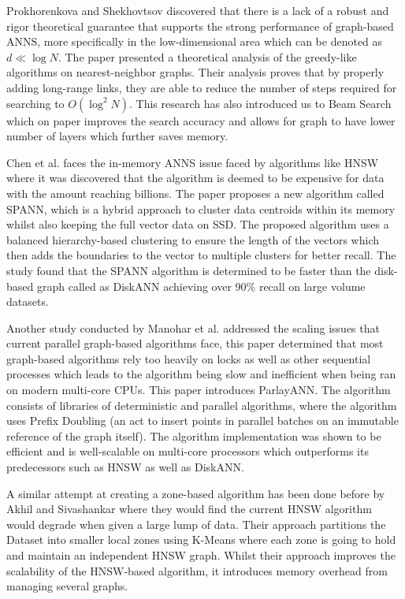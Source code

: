 \documentclass[conference]{IEEEtran}
\begin{document}
Prokhorenkova and Shekhovtsov \cite{prokhorenkova2020} discovered that there is a lack of a robust and rigor theoretical guarantee that supports the strong performance of graph-based ANNS, more specifically in the low-dimensional area which can be denoted as $d \ll \log N$. The paper presented a theoretical analysis of the greedy-like algorithms on nearest-neighbor graphs. Their analysis proves that by properly adding long-range links, they are able to reduce the number of steps required for searching to $O(\log^2 N)$. This research has also introduced us to Beam Search which on paper improves the search accuracy and allows for graph to have lower number of layers which further saves memory.

Chen et al. \cite{chen2021} faces the in-memory ANNS issue faced by algorithms like HNSW where it was discovered that the algorithm is deemed to be expensive for data with the amount reaching billions. The paper proposes a new algorithm called SPANN, which is a hybrid approach to cluster data centroids within its memory whilst also keeping the full vector data on SSD. The proposed algorithm uses a balanced hierarchy-based clustering to ensure the length of the vectors which then adds the boundaries to the vector to multiple clusters for better recall. The study found that the SPANN algorithm is determined to be faster than the disk-based graph called as DiskANN achieving over 90\% recall on large volume datasets.

Another study conducted by Manohar et al. \cite{manohar2024} addressed the scaling issues that current parallel graph-based algorithms face, this paper determined that most graph-based algorithms rely too heavily on locks as well as other sequential processes which leads to the algorithm being slow and inefficient when being ran on modern multi-core CPUs. This paper introduces ParlayANN. The algorithm consists of libraries of deterministic and parallel algorithms, where the algorithm uses Prefix Doubling (an act to insert points in parallel batches on an immutable reference of the graph itself). The algorithm implementation was shown to be efficient and is well-scalable on multi-core processors which outperforms its predecessors such as HNSW as well as DiskANN.

A similar attempt at creating a zone-based algorithm has been done before by Akhil and Sivashankar \cite{akhil2025} where they would find the current HNSW algorithm would degrade when given a large lump of data. Their approach partitions the Dataset into smaller local zones using K-Means where each zone is going to hold and maintain an independent HNSW graph. Whilst their approach improves the scalability of the HNSW-based algorithm, it introduces memory overhead from managing several graphs.
\end{document}
